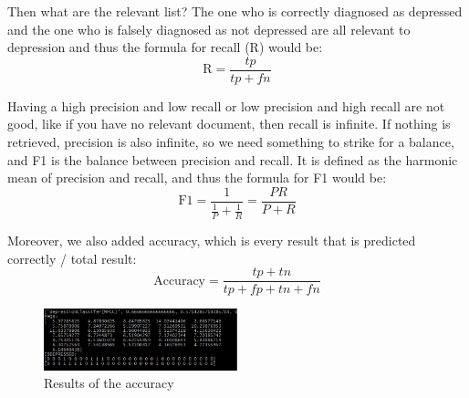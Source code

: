 \documentclass{article}
\begin{document}
 	Then what are the relevant list? The one who is correctly diagnosed as depressed and the one who is falsely diagnosed as not depressed are all relevant to depression and thus the formula for recall (R) would be:
    \begin{equation}\label{eq:recall}
  	\text{R} = \frac{tp}{tp + fn}
 	\end{equation}

 	Having a high precision and low recall or low precision and high recall are not good, like if you have no relevant document, then recall is infinite.
    If nothing is retrieved, precision is also infinite, so we need something to strike for a balance, and F1 is the balance between precision and recall. It is defined as the harmonic mean of precision and recall, and thus the formula for F1 would be:
    \begin{equation}\label{eq:balance}
  	\text{F1} = \frac{1}{\frac{1}{P} + \frac{1}{R}} = \frac{PR}{P + R}
 	\end{equation}

    Moreover, we also added accuracy, which is every result that is predicted correctly / total result:
    \begin{equation}\label{eq:accuracy}
  	\text{Accuracy} = \frac{tp + tn}{tp + fp + tn + fn}
 	\end{equation}

    \begin{figure}[h]
        \begin{center}
        \includegraphics[width=0.5\textwidth]{accu_results}
        \end{center}
        \caption{Results of the accuracy}
        \label{accu_results}
    \end{figure}
\end{document}
